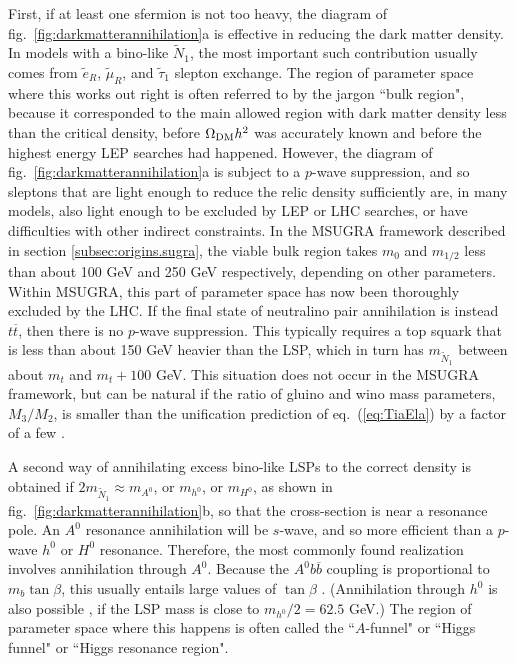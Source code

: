\documentclass[11pt]{article}
\def\stilde{\widetilde}
\begin{document}
First, if at least one sfermion is not too heavy, the diagram of 
fig.~\ref{fig:darkmatterannihilation}a is effective in reducing the dark 
matter density. In models with a bino-like $\stilde N_1$, the most 
important such contribution usually comes from $\stilde e_R$, $\stilde 
\mu_R$, and $\stilde \tau_1$ slepton exchange. The region of parameter 
space where this works out right is often referred to by the jargon ``bulk 
region", because it corresponded to the main allowed region with dark 
matter density less than the critical density, before $\Omega_{\rm DM} 
h^2$ was accurately known and before the highest energy LEP searches had 
happened. However, the diagram of fig.~\ref{fig:darkmatterannihilation}a 
is subject to a $p$-wave suppression, and so sleptons that are light 
enough to reduce the relic density sufficiently are, in many models, also 
light enough to be excluded by LEP or LHC searches, 
or have difficulties with other indirect constraints. 
In the MSUGRA framework described in 
section \ref{subsec:origins.sugra}, the viable bulk region  
takes $m_0$ and $m_{1/2}$ less than about 100 GeV and 250 GeV 
respectively, depending on other parameters. Within MSUGRA, this part of
parameter space has now been thoroughly excluded by the LHC.
%
If the final state of neutralino pair annihilation 
is instead $t \overline t$, then there is no $p$-wave
suppression. This typically requires a top squark that is less than
about 150 GeV heavier than the LSP, which in turn has $m_{\tilde N_1}$ 
between about
$m_t$ and $m_t + 100$ GeV. This situation
does not occur in the MSUGRA framework,
but can be natural if the ratio of gluino and wino mass parameters, 
$M_3/M_2$, is 
smaller than the unification prediction of eq.~(\ref{eq:TiaEla}) by a 
factor of a few \cite{Compressed}. 

A second way of annihilating excess bino-like LSPs to the correct density 
is obtained if $2 m_{\tilde N_1} \approx m_{A^0}$, or $m_{h^0}$, or 
$m_{H^0}$, as shown in fig.~\ref{fig:darkmatterannihilation}b, so that the 
cross-section is near a resonance pole. An $A^0$ resonance annihilation 
will be $s$-wave, and so more efficient than a $p$-wave $h^0$ or $H^0$ 
resonance. Therefore, the most commonly found realization involves 
annihilation through $A^0$. Because the $A^0 b \overline b$ coupling is 
proportional to $m_b \tan\beta$, this usually entails large values of 
$\tan\beta$ \cite{DNDM}. (Annihilation through $h^0$ is also possible 
\cite{hfunnel}, if the LSP mass is close to $m_{h^0}/2 = 62.5$ GeV.) 
The region of parameter space where this happens is often 
called the ``$A$-funnel" or ``Higgs funnel" or ``Higgs resonance region".
\end{document}
